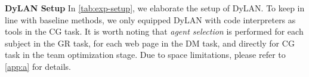 \documentclass{article} %
\begin{document}
\noindent
\textbf{DyLAN Setup}
In \cref{tab:exp-setup}, we elaborate the setup of DyLAN. To keep in line with baseline methods, we only equipped DyLAN with code interpreters as tools in the CG task. It is worth noting that \textit{agent selection} is performed for each subject in the GR task, for each web page in the DM task, and directly for CG task in the team optimization stage. Due to space limitations, please refer to \cref{app:a} for details. 

\begin{table}[t]
\begin{minipage}[t]{0.55\linewidth}
\begin{center}
\end{center}
\end{minipage}
\end{table}
\end{document}

